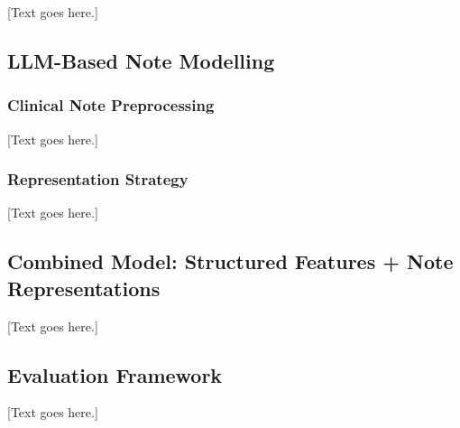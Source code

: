 \documentclass[12pt, a4paper]{article}
\begin{document}
[Text goes here.]


\subsection{LLM-Based Note Modelling}

\subsubsection{Clinical Note Preprocessing}

[Text goes here.]

\subsubsection{Representation Strategy}

[Text goes here.]

\subsection{Combined Model: Structured Features + Note Representations}

[Text goes here.]

\subsection{Evaluation Framework}

[Text goes here.]
\end{document}
